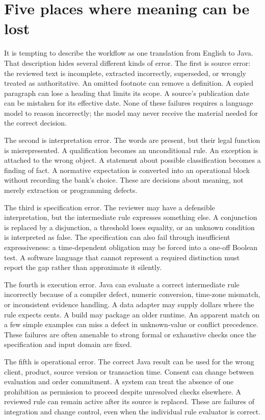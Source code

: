 \section{Five places where meaning can be lost}
\label{merge:M01:02}

\label{sec:problem-boundaries}
It is tempting to describe the workflow as one translation from English to
Java. That description hides several different kinds of error. The first is
source error: the reviewed text is incomplete, extracted incorrectly, superseded,
or wrongly treated as authoritative. An omitted footnote can remove a definition.
A copied paragraph can lose a heading that limits its scope. A source's
publication date can be mistaken for its effective date. None of these failures
requires a language model to reason incorrectly; the model may never receive
the material needed for the correct decision.

The second is interpretation error. The words are present, but their legal
function is misrepresented. A qualification becomes an unconditional rule. An
exception is attached to the wrong object. A statement about possible
classification becomes a finding of fact. A normative expectation is converted
into an operational block without recording the bank's choice. These are
decisions about meaning, not merely extraction or programming defects.

The third is specification error. The reviewer may have a defensible
interpretation, but the intermediate rule expresses something else. A conjunction
is replaced by a disjunction, a threshold loses equality, or an unknown condition
is interpreted as false. The specification can also fail through insufficient
expressiveness: a time-dependent obligation may be forced into a one-off Boolean
test. A software language that cannot represent a required distinction must
report the gap rather than approximate it silently.

The fourth is execution error. Java can evaluate a correct intermediate rule
incorrectly because of a compiler defect, numeric conversion, time-zone mismatch,
or inconsistent evidence handling. A data adapter may supply dollars where the
rule expects cents. A build may package an older runtime. An apparent match on a
few simple examples can miss a defect in unknown-value or conflict precedence.
These failures are often amenable to strong formal or exhaustive checks once
the specification and input domain are fixed.


The fifth is operational error. The correct Java result can be used for the
wrong client, product, source version or transaction time. Consent can change
between evaluation and order commitment. A system can treat the absence of one
prohibition as permission to proceed despite unresolved checks elsewhere. A
reviewed rule can remain active after its source is replaced. These are failures
of integration and change control, even when the individual rule evaluator is
correct.

